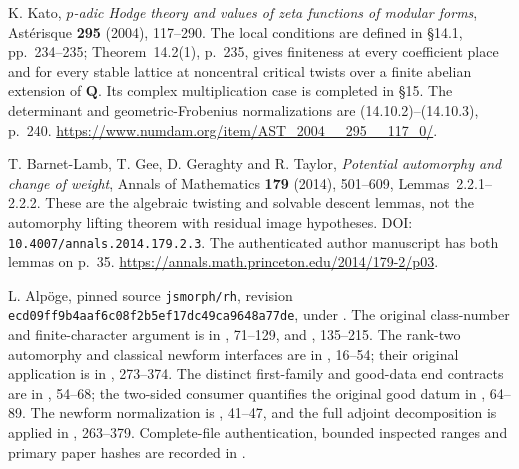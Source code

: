 K. Kato, \emph{$p$-adic Hodge theory and values of zeta functions of
modular forms}, Ast\'erisque \textbf{295} (2004), 117--290.
The local conditions are defined in \S14.1, pp.~234--235;
Theorem~14.2(1), p.~235, gives finiteness at every coefficient place
and for every stable lattice at noncentral critical twists over a
finite abelian extension of $\mathbf Q$.  Its complex multiplication
case is completed in \S15.  The determinant and geometric-Frobenius
normalizations are (14.10.2)--(14.10.3), p.~240.
\url{https://www.numdam.org/item/AST_2004__295__117_0/}.

T. Barnet-Lamb, T. Gee, D. Geraghty and R. Taylor,
\emph{Potential automorphy and change of weight},
Annals of Mathematics \textbf{179} (2014), 501--609,
Lemmas~2.2.1--2.2.2.  These are the algebraic twisting and solvable
descent lemmas, not the automorphy lifting theorem with residual
image hypotheses.  DOI: \texttt{10.4007/annals.2014.179.2.3}.
The authenticated author manuscript has both lemmas on p.~35.
\url{https://annals.math.princeton.edu/2014/179-2/p03}.

L. Alp\"oge, pinned source \texttt{jsmorph/rh}, revision
\texttt{ecd09ff9b4aaf6c08f2b5ef17dc49ca9648a77de}, under
.
The original class-number and finite-character argument is in
, 71--129, and
, 135--215.
The rank-two automorphy and classical newform interfaces are in
,
16--54; their original application is in
, 273--374.
The distinct first-family and good-data end contracts are in
, 54--68;
the two-sided consumer quantifies the original good datum in
, 64--89.
The newform normalization is
, 41--47, and the full
adjoint decomposition is applied in
, 263--379.
Complete-file authentication, bounded inspected ranges and primary
paper hashes are recorded in
.
